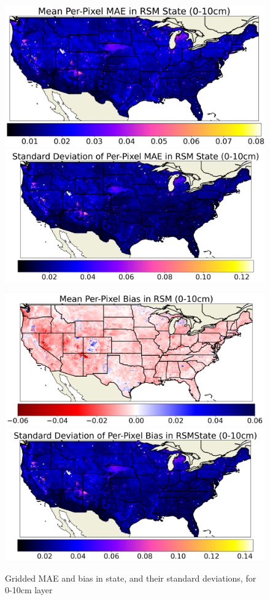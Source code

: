 \begin{figure}[hp!]
    \centering

    \includegraphics[width=.48\linewidth,draft=false]{figures/grid-eval_lstm-rsm-9_full/eval-grid_full_lstm-rsm-9_rsm-10_spatial-stats_abs-err_state-err-abs-mean.png}
    \includegraphics[width=.48\linewidth,draft=false]{figures/grid-eval_lstm-rsm-9_full/eval-grid_full_lstm-rsm-9_rsm-10_spatial-stats_abs-err_state-err-abs-stdev.png}

    \includegraphics[width=.48\linewidth,draft=false]{figures/grid-eval_lstm-rsm-9_full/eval-grid_full_lstm-rsm-9_rsm-10_spatial-stats_bias_state-err-bias-mean.png}
    \includegraphics[width=.48\linewidth,draft=false]{figures/grid-eval_lstm-rsm-9_full/eval-grid_full_lstm-rsm-9_rsm-10_spatial-stats_bias_state-err-bias-stdev.png}

    \caption{Gridded MAE and bias in state, and their standard deviations, for 0-10cm layer}
    \label{acclstm-rsm-9-grid-rsm-10}
\end{figure}

